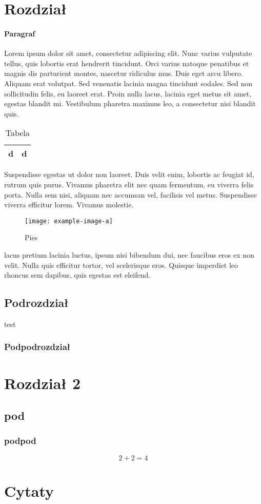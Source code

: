 \documentclass{pwr}
\begin{document}
\tableofcontents
\section{Rozdział}
\paragraph{Paragraf}
Lorem ipsum dolor sit amet, consectetur adipiscing elit. Nunc varius vulputate tellus, quis lobortis erat hendrerit tincidunt. Orci varius natoque penatibus et magnis dis parturient montes, nascetur ridiculus mus. Duis eget arcu libero. Aliquam erat volutpat. Sed venenatis lacinia magna tincidunt sodales. Sed non sollicitudin felis, eu laoreet erat. Proin nulla lacus, lacinia eget metus sit amet, egestas blandit mi. Vestibulum pharetra maximus leo, a consectetur nisi blandit quis.
\begin{table}[h]
\caption{Tabela \cite{book}}
\begin{tabular}{|c | c|}
\hline 
d & d \\
\hline
\end{tabular}
\end{table}
 Suspendisse egestas ut dolor non laoreet. Duis velit enim, lobortis ac feugiat id, rutrum quis purus. Vivamus pharetra elit nec quam fermentum, eu viverra felis porta. Nulla sem nisi, aliquam nec accumsan vel, facilisis vel metus. Suspendisse viverra efficitur lorem. Vivamus molestie.
 \begin{figure}[h]
 \centering
 \texttt{[image: example-image-a]}
 \caption{Pies}
 \end{figure}
 lacus pretium lacinia luctus, ipsum nisi bibendum dui, nec faucibus eros ex non velit. Nulla quis efficitur tortor, vel scelerisque eros. Quisque imperdiet leo rhoncus sem dapibus, quis egestas est eleifend. 
\subsection{Podrozdział}
test
\subsubsection{Podpodrozdział}
\section{Rozdział 2}
\subsection{pod}
\subsubsection{podpod}
\begin{equation}
2+2=4
\end{equation}
\section{Cytaty}
\cite{online}
\cite{article}
\printbibliography[nottype=online]
\printbibliography[title={Źródła},type=online]
\end{document}
